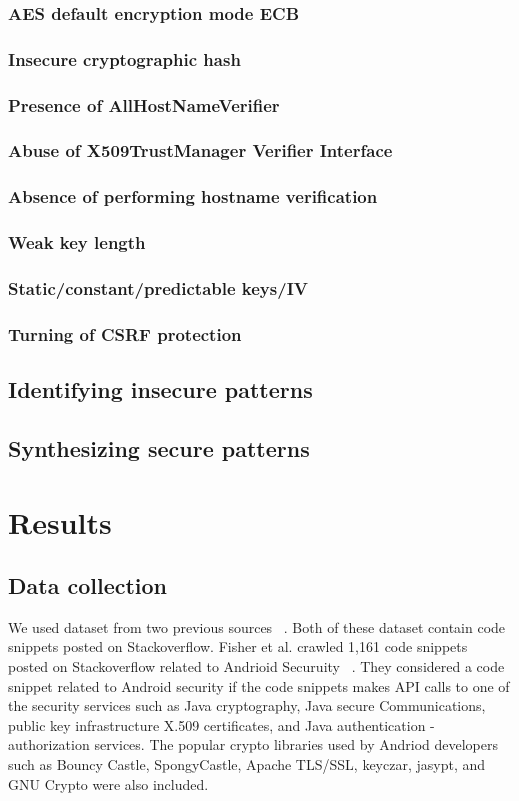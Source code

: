 \documentclass[sigconf]{acmart}
\begin{document}
\subsubsection{AES default encryption mode ECB }
\subsubsection{Insecure cryptographic hash}
\subsubsection{Presence of AllHostNameVerifier}
\subsubsection{Abuse of X509TrustManager Verifier Interface}
\subsubsection{Absence of performing hostname verification}
\subsubsection{Weak key length}
\subsubsection{Static/constant/predictable keys/IV }
\subsubsection{Turning of CSRF protection }
\subsection{Identifying insecure patterns}
\subsection{Synthesizing secure patterns}


\section{Results}
\subsection{Data collection} 
  We used dataset from two previous sources ~\cite{meng2018secure,fischer2017stack}. Both of these dataset contain code snippets posted on Stackoverflow. 
  Fisher et al. crawled 1,161 code snippets posted on Stackoverflow related to Andrioid Securuity ~\cite{fischer2017stack}. They considered a code snippet related to Android security if the code snippets makes API calls to
  one of the security services such as Java cryptography, Java secure Communications, public key infrastructure X.509 certificates, and Java authentication - authorization services. The popular crypto libraries used by Andriod developers such as Bouncy Castle, SpongyCastle, Apache TLS/SSL, keyczar, jasypt, and GNU Crypto were also included. 
  
\end{document}
